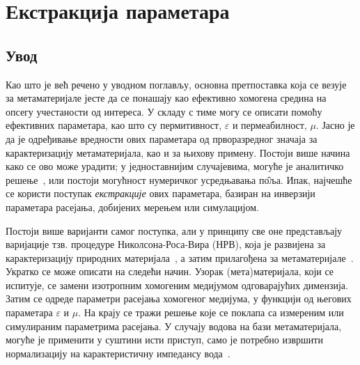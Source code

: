 




\newcommand{\sirina}{\columnwidth}
\newcommand{\sirinab}{\columnwidth}
\newcommand{\sirinac}{0.48\columnwidth}
\newcommand{\SkalaA}{0.3}
\newcommand{\SkalaB}{0.3}
\newcommand{\SkalaC}{0.3}
\newcommand{\subscript}[1]{\ensuremath{_{\textrm{#1}}}}




%
\newcommand{\ga}{\Gamma\Pi}

\chapter{Екстракција параметара}

\section{Увод}

Као што је већ речено у уводном поглављу, основна претпоставка која се везује за метаматеријале јесте да се понашају као ефективно хомогена средина на опсегу учестаности од интереса. У складу с тиме могу се описати помоћу ефективних параметара, као што су пермитивност, $\varepsilon$ и пермеабилност, $\mu$. Јасно је да је одређивање вредности ових параметара од прворазредног значаја за карактеризацију метаматеријала, као и за њихову примену. Постоји више начина како се ово може урадити; у једноставнијим случајевима, могуће је аналитичко решење~\cite{pendri:99}, или постоји могућност нумеричког усредњавања п\^{о}ља. Ипак, најчешће се користи поступак \emph{екстракције} ових параметара, базиран на инверзији параметара расејања, добијених мерењем или симулацијом.

Постоји више варијанти самог поступка, али у принципу све оне представљају варијације тзв. процедуре Николсона-Роса-Вира (НРВ), која је развијена за карактеризацију природних материјала~\cite{Nicol:70,Weir:74}, а затим прилагођена за метаматеријале~\cite{Smith:02,Markos:03}. Укратко се може описати на следећи начин. Узорак (мета)материјала, који се испитује, се замени изотропним хомогеним медијумом одговарајућих димензија. Затим се одреде параметри расејања хомогеног медијума, у функцији од његових параметара $\varepsilon$ и $\mu$. На крају се тражи решење које се поклапа са измереним или симулираним параметрима расејања. У случају водова на бази метаматеријала, могуће је применити у суштини исти приступ, само је потребно извршити нормализацију на карактеристичну импедансу вода~\cite{Mao:05}.

